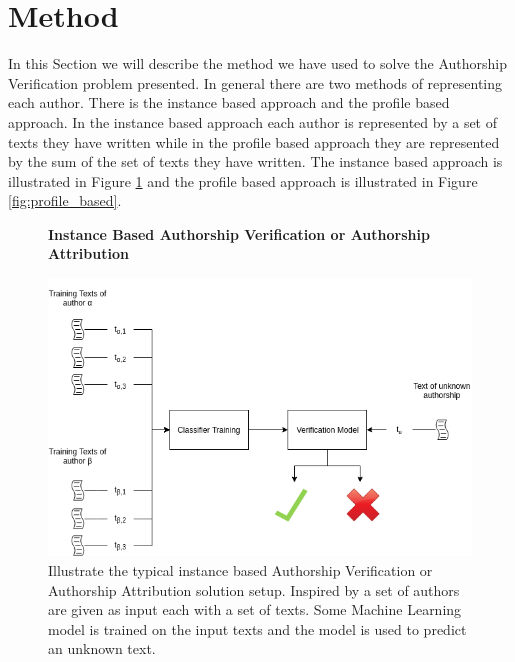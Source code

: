 \section{Method} \label{sec:method}

In this Section we will describe the method we have used to solve the Authorship
Verification problem presented. In general there are two methods of representing
each author. There is the instance based approach and the profile based
approach. In the instance based approach each author is represented by a set of
texts they have written while in the profile based approach they are represented
by the sum of the set of texts they have written. The instance based approach is
illustrated in Figure \ref{fig:instance_based} and the profile based approach is
illustrated in Figure \ref{fig:profile_based}.

\begin{figure}[htb]
    \centering
    \textbf{Instance Based Authorship Verification or Authorship Attribution}\par\medskip
    \includegraphics[scale=0.5]{./pictures/method/InstanceBased.png} 
    \caption{Illustrate the typical instance based Authorship Verification or
        Authorship Attribution solution setup. Inspired by \cite{stamatos2009} a
        set of authors are given as input each with a set of texts. Some Machine
        Learning model is trained on the input texts and the model is used to
        predict an unknown text. }

    \label{fig:instance_based}
\end{figure}

